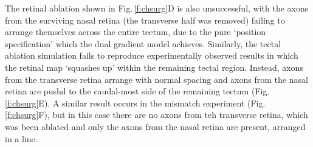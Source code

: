 \documentclass[11pt, a4paper]{article}
\begin{document}
The retinal ablation shown in Fig.\,\ref{f:chsurg}D is also unsuccessful, with
the axons from the surviving nasal retina (the transverse half was removed)
failing to arrange themselves across the entire tectum, due to the pure
`position specification' which the dual gradient model achieves. Similarly,
the tectal ablation simulation fails to reproduce experimentally observed
results in which the retinal map `squashes up' within the remaining tectal
region. Instead, axons from the transverse retina arrange with normal spacing
and axons from the nasal retina are pushd to the caudal-most side of the
remaining tectum (Fig.\,\ref{f:chsurg}E). A similar result occurs in the
mismatch experiment (Fig.\,\ref{f:chsurg}F), but in this case there are no
axons from teh transverse retina, which was been ablated and only the axons
from the nasal retina are present, arranged in a line.
\end{document}
